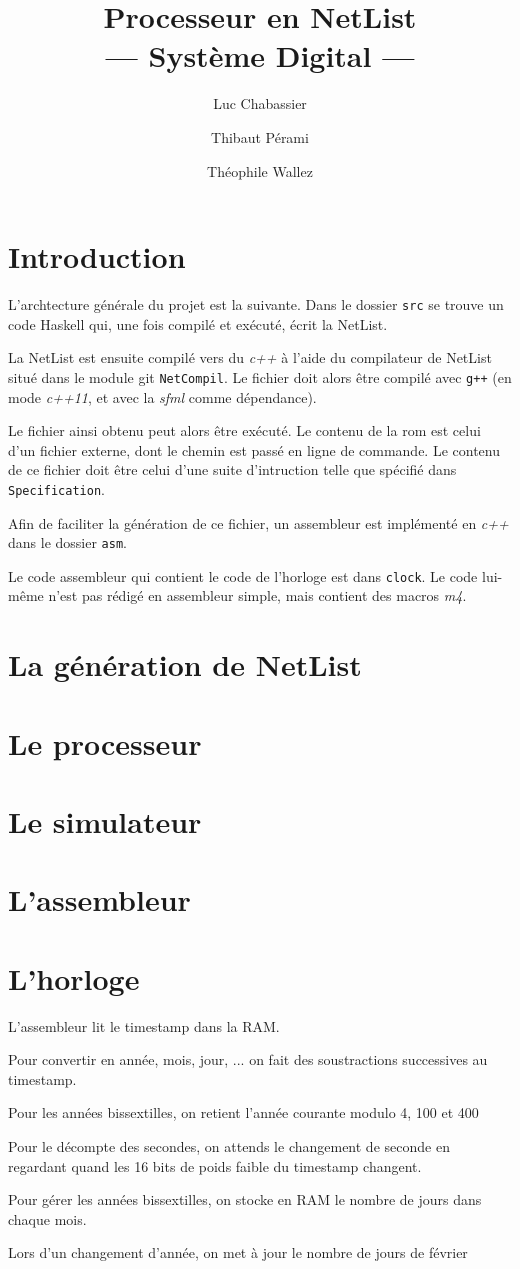 \documentclass{article}
\title{Processeur en NetList\\--- Système Digital ---}
\author{Luc Chabassier \and Thibaut Pérami \and Théophile Wallez}
\begin{document}
\maketitle

\section{Introduction}
L'archtecture générale du projet est la suivante. Dans le dossier \texttt{src}
se trouve un code Haskell qui, une fois compilé et exécuté, écrit la NetList.

La NetList est ensuite compilé vers du \emph{c++} à l'aide du compilateur de
NetList situé dans le module git \texttt{NetCompil}. Le fichier doit alors être
compilé avec \texttt{g++} (en mode \emph{c++11}, et avec la \emph{sfml} comme
dépendance).

Le fichier ainsi obtenu peut alors être exécuté. Le contenu de la rom est celui
d'un fichier externe, dont le chemin est passé en ligne de commande. Le contenu
de ce fichier doit être celui d'une suite d'intruction telle que spécifié dans
\texttt{Specification}.

Afin de faciliter la génération de ce fichier, un assembleur est implémenté en
\emph{c++} dans le dossier \texttt{asm}.

Le code assembleur qui contient le code de l'horloge est dans \texttt{clock}.
Le code lui-même n'est pas rédigé en assembleur simple, mais contient des
macros \emph{m4}.

\section{La génération de NetList}

\section{Le processeur}

\section{Le simulateur}

\section{L'assembleur}

\section{L'horloge}
L'assembleur lit le timestamp dans la RAM.

Pour convertir en année, mois, jour, ... on fait des soustractions
successives au timestamp.

Pour les années bissextilles, on retient l'année courante modulo 4, 100 et
400

Pour le décompte des secondes, on attends le changement de seconde en
regardant quand les 16 bits de poids faible du timestamp changent.

Pour gérer les années bissextilles, on stocke en RAM le nombre de jours
dans chaque mois.

Lors d'un changement d'année, on met à jour le nombre de jours de février
\end{document}
